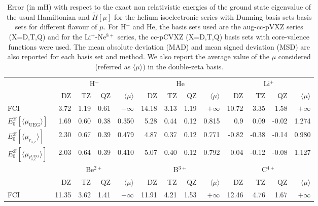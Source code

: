 \documentclass[aip,jcp,reprint,noshowkeys,superscriptaddress]{revtex4-1}
\newcommand{\basis}[0]{\mathcal{B}}
\newcommand{\muuegav}{\langle \mu_{\text{UEG}}\rangle}
\newcommand{\muav}{\langle \mu\rangle}
\newcommand{\murscav}{\langle \mu_{r_{s,c}}\rangle}
\newcommand{\mursclda}{\langle \mu_{r_{s,c}^{\text{UEG}}}\rangle}
\begin{document}
\begin{table*}
\label{table_conv_e_mu_iso}
\caption{Error (in mH) with respect to the exact non relativistic energies of the ground state eigenvalue of the usual Hamiltonian and $\tilde{H}[\mu]$ for the helium isoelectronic series with Dunning basis sets basis sets for different flavour of $\mu$. For H$^{-}$ and He, the basis sets used are the aug-cc-pVXZ series (X=D,T,Q) and for the Li$^+$-Ne$^{8+}$ series, the cc-pCVXZ (X=D,T,Q) basis sets with core-valence functions were used. The mean absolute deviation (MAD) and mean signed deviation (MSD) are also reported for each basis set and method. We also report the average value of the $\mu$ considered (referred as $\muav$) in the double-zeta basis. }
\begin{ruledtabular}
\begin{tabular}{l|rrr|r||rrr|r||rrr|r|}
                         &\multicolumn{4}{c}{H$^-$}                & \multicolumn{4}{c}{He}                  & \multicolumn{4}{c}{Li$^+$}               \\
                         &   DZ    &  TZ      &   QZ    & $\muav$&  DZ     &   TZ     &  QZ  & $\muav$   &   DZ    &   TZ     &  QZ    & $\muav$  \\
\hline 
 FCI                     &   3.72  &    1.19  &   0.61  &$+\infty$ &  14.18  &   3.13   &  1.19&$+\infty$    &  10.72  &   3.35   &  1.58  &$+\infty$  \\      
$E_0^{\basis}[\muuegav]$ &   1.69  &    0.60  &   0.38  & 0.350    &  5.28   &   0.44   &  0.12& 0.815       &  0.9    &   0.09   & -0.02  & 1.274     \\      
$E_0^{\basis}[\murscav]$ &   2.30  &    0.67  &   0.39  & 0.479    &  4.87   &   0.37   &  0.12& 0.771       &  -0.82  &  -0.38   & -0.14  & 0.980     \\      
$E_0^{\basis}[\mursclda]$&   2.03  &    0.64  &   0.39  & 0.410    &  5.07   &   0.40   &  0.12& 0.792       &  0.04   &  -0.12   & -0.08  & 1.127     \\      
\hline              
                         &\multicolumn{4}{c}{Be$^{2+}$}            & \multicolumn{4}{c}{B$^{3+}$}            & \multicolumn{4}{c}{C$^{4+}$}    \\
                         &   DZ    &  TZ      &   QZ    & $\muav$&  DZ     &   TZ     &  QZ     & $\muav$&   DZ    &   TZ     &  QZ    & $\muav$  \\
\hline 
 FCI                     &  11.35  &   3.62   &  1.41   &$+\infty$ &  11.91  &   4.21   &  1.53   &$+\infty$ &  12.46  &   4.76   &  1.67  &$+\infty$    \\  

\end{tabular}
\end{ruledtabular}
\end{table*}
\end{document}
